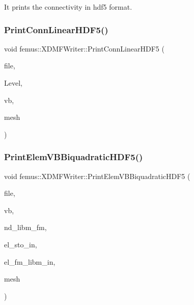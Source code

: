 It prints the connectivity in hdf5 format. 

\mbox{\label{classfemus_1_1_x_d_m_f_writer_ada469f532506e9fb87cbea43c15abde4}} 
\subsubsection{\texorpdfstring{Print\+Conn\+Linear\+H\+D\+F5()}{PrintConnLinearHDF5()}}
{\footnotesize\ttfamily void femus\+::\+X\+D\+M\+F\+Writer\+::\+Print\+Conn\+Linear\+H\+D\+F5 (\begin{DoxyParamCaption}\item[{hid\+\_\+t}]{file,  }\item[{const \mbox{\hyperlink{_typedefs_8hpp_a91ad9478d81a7aaf2593e8d9c3d06a14}{uint}}}]{Level,  }\item[{const \mbox{\hyperlink{_typedefs_8hpp_a91ad9478d81a7aaf2593e8d9c3d06a14}{uint}}}]{vb,  }\item[{const \mbox{\hyperlink{classfemus_1_1_multi_level_mesh_two}{Multi\+Level\+Mesh\+Two}} \&}]{mesh }\end{DoxyParamCaption})\hspace{0.3cm}{\ttfamily [static]}}

\mbox{\label{classfemus_1_1_x_d_m_f_writer_a6977c2796b24f796be5b08bbea62f3ce}} 
\subsubsection{\texorpdfstring{Print\+Elem\+V\+B\+Biquadratic\+H\+D\+F5()}{PrintElemVBBiquadraticHDF5()}}
{\footnotesize\ttfamily void femus\+::\+X\+D\+M\+F\+Writer\+::\+Print\+Elem\+V\+B\+Biquadratic\+H\+D\+F5 (\begin{DoxyParamCaption}\item[{hid\+\_\+t}]{file,  }\item[{const \mbox{\hyperlink{_typedefs_8hpp_a91ad9478d81a7aaf2593e8d9c3d06a14}{uint}}}]{vb,  }\item[{const std\+::vector$<$ int $>$ \&}]{nd\+\_\+libm\+\_\+fm,  }\item[{\mbox{\hyperlink{classfemus_1_1_elem_sto_base}{Elem\+Sto\+Base}} $\ast$$\ast$}]{el\+\_\+sto\+\_\+in,  }\item[{const std\+::vector$<$ std\+::pair$<$ int, int $>$ $>$}]{el\+\_\+fm\+\_\+libm\+\_\+in,  }\item[{const \mbox{\hyperlink{classfemus_1_1_multi_level_mesh_two}{Multi\+Level\+Mesh\+Two}} \&}]{mesh }\end{DoxyParamCaption})\hspace{0.3cm}{\ttfamily [static]}}

